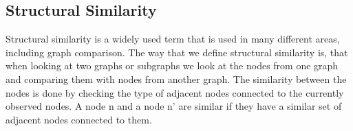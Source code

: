 \subsection{Structural Similarity}
Structural similarity is a widely used term that is used in many different areas, including graph comparison. The way that we define structural similarity is, that when looking at two graphs or subgraphs we look at the nodes from one graph and comparing them with nodes from another graph. The similarity between the nodes is done by checking the type of adjacent nodes connected to the currently observed nodes. 
A node n and a node n' are similar if they have a similar set of adjacent nodes connected to them.
